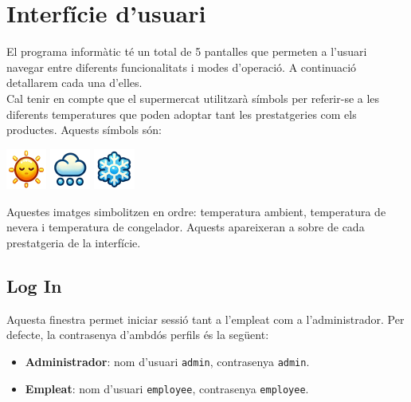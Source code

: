 \documentclass[a4paper,12pt]{article}
\begin{document}
	\newpage
	\section{Interfície d'usuari}
	
	El programa informàtic té un total de 5 pantalles que permeten a l'usuari navegar entre diferents funcionalitats i modes d'operació. A continuació detallarem cada una d'elles. \\
	
	Cal tenir en compte que el supermercat utilitzarà símbols per referir-se a les diferents temperatures que poden adoptar tant les prestatgeries com els productes. Aquests símbols són:
	
	\begin{center}
		\includegraphics[width=0.1\textwidth]{assets/AMBIENT.png} %
		\hspace{1cm}
		\includegraphics[width=0.1\textwidth]{assets/REFRIGERATED.png} %
		\hspace{1cm} %
		\includegraphics[width=0.1\textwidth]{assets/FROZEN.png} %
	\end{center}
	
	Aquestes imatges simbolitzen en ordre: temperatura ambient, temperatura de nevera i temperatura de congelador. Aquests apareixeran a sobre de cada prestatgeria de la interfície.
	
	\newpage
	\subsection{Log In}
	\label{sec:logIn}
	
	Aquesta finestra permet iniciar sessió tant a l'empleat com a l'administrador. Per defecte, la contrasenya d'ambdós perfils és la següent:
	
	\begin{itemize}
		\item \textbf{Administrador}: nom d'usuari \texttt{admin}, contrasenya \texttt{admin}.
		\item \textbf{Empleat}: nom d'usuari \texttt{employee}, contrasenya \texttt{employee}.
	\end{itemize}
	
\end{document}
